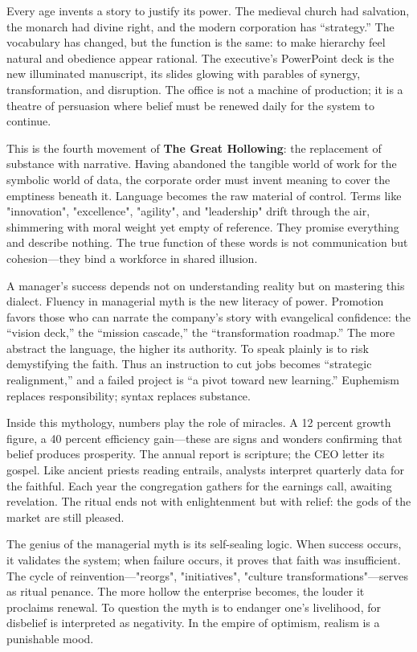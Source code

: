 \documentclass[11pt,twoside]{book}
\begin{document}
Every age invents a story to justify its power.  The medieval church had salvation, the monarch had divine right, and the modern corporation has “strategy.”  The vocabulary has changed, but the function is the same: to make hierarchy feel natural and obedience appear rational.  The executive’s PowerPoint deck is the new illuminated manuscript, its slides glowing with parables of synergy, transformation, and disruption.  The office is not a machine of production; it is a theatre of persuasion where belief must be renewed daily for the system to continue.

This is the fourth movement of \textbf{The Great Hollowing}: the replacement of substance with narrative.  Having abandoned the tangible world of work for the symbolic world of data, the corporate order must invent meaning to cover the emptiness beneath it.  Language becomes the raw material of control.  Terms like "innovation", "excellence", "agility", and "leadership" drift through the air, shimmering with moral weight yet empty of reference.  They promise everything and describe nothing.  The true function of these words is not communication but cohesion—they bind a workforce in shared illusion.

A manager’s success depends not on understanding reality but on mastering this dialect.  Fluency in managerial myth is the new literacy of power.  Promotion favors those who can narrate the company’s story with evangelical confidence: the “vision deck,” the “mission cascade,” the “transformation roadmap.”  The more abstract the language, the higher its authority.  To speak plainly is to risk demystifying the faith.  Thus an instruction to cut jobs becomes “strategic realignment,” and a failed project is “a pivot toward new learning.”  Euphemism replaces responsibility; syntax replaces substance.

Inside this mythology, numbers play the role of miracles.  A 12 percent growth figure, a 40 percent efficiency gain—these are signs and wonders confirming that belief produces prosperity.  The annual report is scripture; the CEO letter its gospel.  Like ancient priests reading entrails, analysts interpret quarterly data for the faithful.  Each year the congregation gathers for the earnings call, awaiting revelation.  The ritual ends not with enlightenment but with relief: the gods of the market are still pleased.

The genius of the managerial myth is its self-sealing logic.  When success occurs, it validates the system; when failure occurs, it proves that faith was insufficient.  The cycle of reinvention—"reorgs", "initiatives", "culture transformations"—serves as ritual penance.  The more hollow the enterprise becomes, the louder it proclaims renewal.  To question the myth is to endanger one’s livelihood, for disbelief is interpreted as negativity.  In the empire of optimism, realism is a punishable mood.
\end{document}
